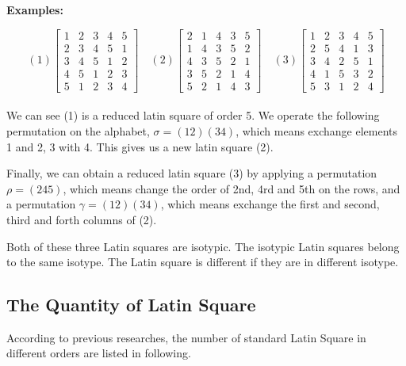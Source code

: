 \documentclass[12pt]{article}
\begin{document}
\textbf{Examples:}

\[ (1) \begin{bmatrix} 1 & 2 & 3 & 4 & 5\\2 & 3 & 4 & 5 & 1\\3 & 4 & 5 & 1 & 2\\
                         4 & 5 & 1 & 2 & 3\\5 & 1 & 2 & 3 & 4 \end{bmatrix}\quad
   (2) \begin{bmatrix} 2 & 1 & 4 & 3 & 5\\1 & 4 & 3 & 5 & 2\\4 & 3 & 5 & 2 & 1\\
                         3 & 5 & 2 & 1 & 4\\5 & 2 & 1 & 4 & 3 \end{bmatrix}\quad
   (3) \begin{bmatrix} 1 & 2 & 3 & 4 & 5\\2 & 5 & 4 & 1 & 3\\3 & 4 & 2 & 5 & 1\\
                         4 & 1 & 5 & 3 & 2\\5 & 3 & 1 & 2 & 4 \end{bmatrix} \]\\
We can see (1) is a reduced latin square of order 5. We operate the following permutation on the alphabet, $\sigma = (12)(34)$, which means exchange elements 1 and 2, 3 with 4. This gives us a
new latin square (2).

Finally, we can obtain a reduced latin square (3) by applying a permutation $\rho = (245)$, which means change the order of 2nd, 4rd and 5th on the rows, and a permutation $\gamma = (12)(34)$, which means exchange the first and second, third and forth columns of (2). 

Both of these three Latin squares are isotypic. The isotypic Latin squares belong to the same isotype. The Latin square is different if they are in different isotype. 

\subsection{The Quantity of Latin Square}

According to previous researches, the number of standard Latin Square in different orders are listed in following.
\end{document}
